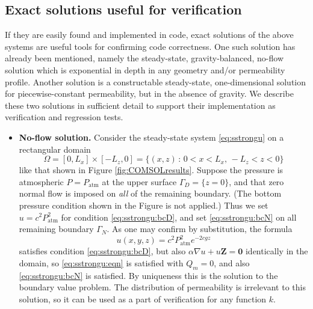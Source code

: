 \documentclass[11pt]{amsart}
\newcommand{\bZ}{\mathbf{Z}}
\newcommand{\bzero}{\bm{0}}
\newcommand{\grad}{\nabla}
\newcommand{\Patm}{P_{\text{atm}}}
\begin{document}
\subsection{Exact solutions useful for verification}  If they are easily found and implemented in code, exact solutions of the above systems are useful tools for confirming code correctness.  One such solution has already been mentioned, namely the steady-state, gravity-balanced, no-flow solution which is exponential in depth in any geometry and/or permeability profile.  Another solution is a constructable steady-state, one-dimensional solution for piecewise-constant permeability, but in the absence of gravity.  We describe these two solutions in sufficient detail to support their implementation as verification and regression tests.

\begin{itemize}
\item \textbf{No-flow solution.}  Consider the steady-state system \eqref{eq:sstrongu} on a rectangular domain
\begin{equation}
\Omega = [0,L_x]\times [-L_z,0] = \{(x,z)\,:\,0<x<L_x, \,-L_z<z<0\}
\end{equation}
like that shown in Figure \ref{fig:COMSOLresults}.  Suppose the pressure is atmospheric $P=\Patm$ at the upper surface $\Gamma_D=\{z=0\}$, and that zero normal flow is imposed on \emph{all} of the remaining boundary.  (The bottom pressure condition shown in the Figure is not applied.)  Thus we set $u=c^2\Patm^2$ for condition \eqref{eq:sstrongu:bcD}, and set \eqref{eq:sstrongu:bcN} on all remaining boundary $\Gamma_N$.  As one may confirm by substitution, the formula
\begin{equation}
u(x,y,z) = c^2 \Patm^2 e^{-2cgz} \label{eq:noflow}
\end{equation}
satisfies condition \eqref{eq:sstrongu:bcD}, but also $\alpha\grad u + u \bZ = \bzero$ identically in the domain, so \eqref{eq:sstrongu:eqn} is satisfied with $Q_m=0$, and also \eqref{eq:sstrongu:bcN} is satisfied.  By uniqueness this is the solution to the boundary value problem.  The distribution of permeability is irrelevant to this solution, so it can be used as a part of verification for any function $k$.


\end{itemize}
\end{document}
